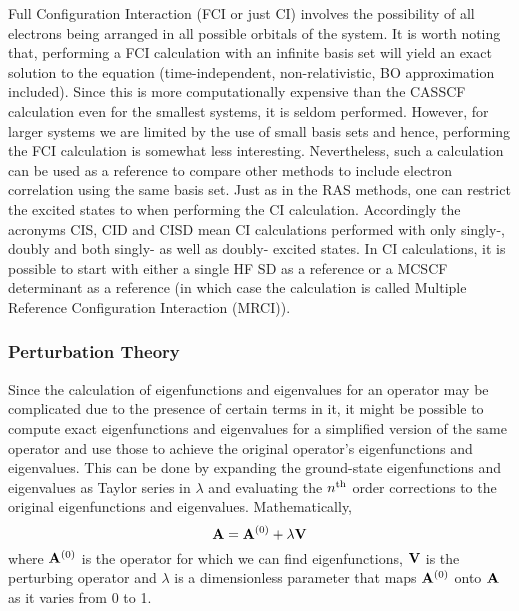             Full Configuration Interaction (FCI or just CI) involves the possibility of all electrons being arranged in all possible orbitals of the system. It is worth noting that, performing a FCI calculation with an infinite basis set will yield an exact solution to the \Schrodinger{} equation (time-independent, non-relativistic, BO approximation included). Since this is more computationally expensive than the CASSCF calculation even for the smallest systems, it is seldom performed. However, for larger systems we are limited by the use of small basis sets and hence, performing the FCI calculation is somewhat less interesting. Nevertheless, such a calculation can be used as a reference to compare other methods to include electron correlation using the same basis set. Just as in the RAS methods, one can restrict the excited states to when performing the CI calculation. Accordingly the acronyms CIS, CID and CISD mean CI calculations performed with only singly-, doubly and both singly- as well as doubly- excited states. In CI calculations, it is possible to start with either a single HF SD as a reference or a MCSCF determinant as a reference (in which case the calculation is called Multiple Reference Configuration Interaction (MRCI)).

            \subsubsection{Perturbation Theory}
                Since the calculation of eigenfunctions and eigenvalues for an operator may be complicated due to the presence of certain terms in it, it might be possible to compute exact eigenfunctions and eigenvalues for a simplified version of the same operator and use those to achieve the original operator's eigenfunctions and eigenvalues. This can be done by expanding the ground-state eigenfunctions and eigenvalues as Taylor series in $\lambda$ and evaluating the $n^{\rm th}$ order corrections to the original eigenfunctions and eigenvalues. Mathematically,
                \begin{equation}\label{eq:perturbation theory}
                    {\mathbf {A}} = {\mathbf {A}}^{(0)} + \lambda {\mathbf {V}}
                \end{equation}
                where ${\mathbf {A}}^{(0)}$ is the operator for which we can find eigenfunctions, ${\mathbf {V}}$ is the perturbing operator and $\lambda$ is a dimensionless parameter that maps ${\mathbf {A}}^{(0)}$ onto ${\mathbf {A}}$ as it varies from 0 to 1.

